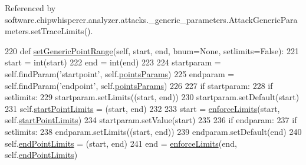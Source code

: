 Referenced by software.\+chipwhisperer.\+analyzer.\+attacks.\+\_\+generic\+\_\+parameters.\+Attack\+Generic\+Parameters.\+set\+Trace\+Limits().


\begin{DoxyCode}
220     \textcolor{keyword}{def }\hyperlink{classsoftware_1_1chipwhisperer_1_1analyzer_1_1attacks_1_1__generic__parameters_1_1AttackGenericParameters_acd64ece43b66a7306826d17cee6bc473}{setGenericPointRange}(self, start, end, bnum=None, setlimits=False):
221         start = int(start)
222         end = int(end)
223 
224         startparam = self.findParam(\textcolor{stringliteral}{'startpoint'}, self.\hyperlink{classsoftware_1_1chipwhisperer_1_1analyzer_1_1attacks_1_1__generic__parameters_1_1AttackGenericParameters_a193c6d6be7e13f462d53a95029caa2d1}{pointsParams})
225         endparam = self.findParam(\textcolor{stringliteral}{'endpoint'}, self.\hyperlink{classsoftware_1_1chipwhisperer_1_1analyzer_1_1attacks_1_1__generic__parameters_1_1AttackGenericParameters_a193c6d6be7e13f462d53a95029caa2d1}{pointsParams})
226 
227         \textcolor{keywordflow}{if} startparam:
228             \textcolor{keywordflow}{if} setlimits:
229                 startparam.setLimits((start, end))
230                 startparam.setDefault(start)
231                 self.\hyperlink{classsoftware_1_1chipwhisperer_1_1analyzer_1_1attacks_1_1__generic__parameters_1_1AttackGenericParameters_a656b1ebedb123bf23b66ff09b6f344d2}{startPointLimits} = (start, end)
232 
233             start = \hyperlink{namespacesoftware_1_1chipwhisperer_1_1analyzer_1_1attacks_1_1__generic__parameters_abcd215b51e9572a0f8de005212077184}{enforceLimits}(start, self.\hyperlink{classsoftware_1_1chipwhisperer_1_1analyzer_1_1attacks_1_1__generic__parameters_1_1AttackGenericParameters_a656b1ebedb123bf23b66ff09b6f344d2}{startPointLimits})
234             startparam.setValue(start)
235 
236         \textcolor{keywordflow}{if} endparam:
237             \textcolor{keywordflow}{if} setlimits:
238                 endparam.setLimits((start, end))
239                 endparam.setDefault(end)
240                 self.\hyperlink{classsoftware_1_1chipwhisperer_1_1analyzer_1_1attacks_1_1__generic__parameters_1_1AttackGenericParameters_a404675ed60d616274649573aec1ca5e3}{endPointLimits} = (start, end)
241             end = \hyperlink{namespacesoftware_1_1chipwhisperer_1_1analyzer_1_1attacks_1_1__generic__parameters_abcd215b51e9572a0f8de005212077184}{enforceLimits}(end, self.\hyperlink{classsoftware_1_1chipwhisperer_1_1analyzer_1_1attacks_1_1__generic__parameters_1_1AttackGenericParameters_a404675ed60d616274649573aec1ca5e3}{endPointLimits})

\end{DoxyCode}
